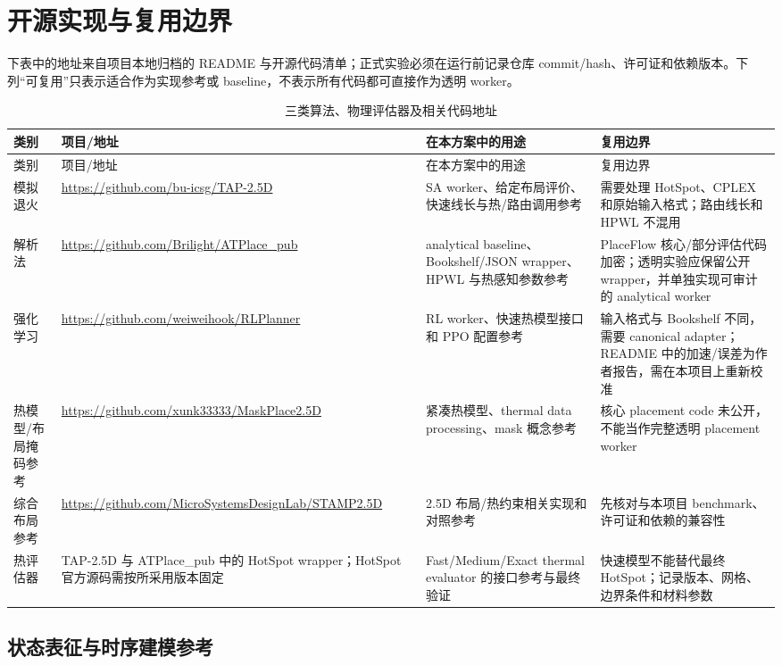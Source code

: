\documentclass[UTF8,a4paper,11pt]{ctexart}
\newcommand{\urlbreak}[1]{\url{#1}}
\begin{document}
\section{开源实现与复用边界}

下表中的地址来自项目本地归档的 README 与开源代码清单；正式实验必须在运行前记录仓库 commit/hash、许可证和依赖版本。下列“可复用”只表示适合作为实现参考或 baseline，不表示所有代码都可直接作为透明 worker。

\begin{longtable}{p{}p{}p{}p{}}
\caption{三类算法、物理评估器及相关代码地址}\label{tab:opensource}\\
\toprule
类别 & 项目/地址 & 在本方案中的用途 & 复用边界 \\
\midrule
\endfirsthead
\toprule
类别 & 项目/地址 & 在本方案中的用途 & 复用边界 \\
\midrule
\endhead
\bottomrule
\endfoot
模拟退火 & \urlbreak{https://github.com/bu-icsg/TAP-2.5D} & SA worker、给定布局评价、快速线长与热/路由调用参考 & 需要处理 HotSpot、CPLEX 和原始输入格式；路由线长和 HPWL 不混用 \\
解析法 & \urlbreak{https://github.com/Brilight/ATPlace_pub} & analytical baseline、Bookshelf/JSON wrapper、HPWL 与热感知参数参考 & PlaceFlow 核心/部分评估代码加密；透明实验应保留公开 wrapper，并单独实现可审计的 analytical worker \\
强化学习 & \urlbreak{https://github.com/weiweihook/RLPlanner} & RL worker、快速热模型接口和 PPO 配置参考 & 输入格式与 Bookshelf 不同，需要 canonical adapter；README 中的加速/误差为作者报告，需在本项目上重新校准 \\
热模型/布局掩码参考 & \urlbreak{https://github.com/xunk33333/MaskPlace2.5D} & 紧凑热模型、thermal data processing、mask 概念参考 & 核心 placement code 未公开，不能当作完整透明 placement worker \\
综合布局参考 & \urlbreak{https://github.com/MicroSystemsDesignLab/STAMP2.5D} & 2.5D 布局/热约束相关实现和对照参考 & 先核对与本项目 benchmark、许可证和依赖的兼容性 \\
热评估器 & TAP-2.5D 与 ATPlace\_pub 中的 HotSpot wrapper；HotSpot 官方源码需按所采用版本固定 & Fast/\allowbreak Medium/\allowbreak Exact thermal evaluator 的接口参考与最终验证 & 快速模型不能替代最终 HotSpot；记录版本、网格、边界条件和材料参数 \\
\end{longtable}

\subsection{状态表征与时序建模参考}
\end{document}
